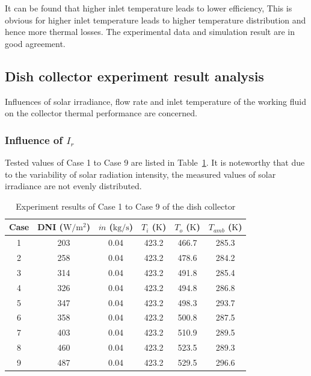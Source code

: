 It can be found that higher inlet temperature leads to lower efficiency, This is obvious for higher inlet temperature leads to higher temperature distribution and hence more thermal losses. The experimental data and simulation result are in good agreement.

\subsection{Dish collector experiment result analysis}
Influences of solar irradiance, flow rate and inlet temperature of the working fluid on the collector thermal performance are concerned.
\subsubsection{Influence of $I_r$}
Tested values of Case 1 to Case 9 are listed in Table~\ref{tab:ResultOfDish1}. It is noteworthy that due to the variability of solar radiation intensity, the measured values of solar irradiance are not evenly distributed.

\begin{table}[htbp]\footnotesize
	\caption{Experiment results of Case 1 to Case 9 of the dish collector}
	\begin{center}
	\begin{tabular}{cccccc}
		\toprule
		Case	& DNI ($\mathrm{W/m^2}$)	&	$\dot{m}$ ($\mathrm{kg/s}$)			&	$T_i$ ($\mathrm{K}$)	&	$T_o$ ($\mathrm{K}$)		&	$T_{amb}$ ($\mathrm{K}$)\\
		\midrule
		1	&	203	&	0.04	&	423.2	&	466.7	&	285.3\\
		2	&	258	&	0.04	&	423.2	&	478.6	&	284.2\\
		3	&	314	&	0.04	&	423.2	&	491.8	&	285.4	\\
		4	&	326	&	0.04	&	423.2	&	494.8	&	286.8\\
		5	&	347	&	0.04	&	423.2	&	498.3	&	293.7\\
		6	&	358	&	0.04	&	423.2	&	500.8	&	287.5\\
		7	&	403	&	0.04	&	423.2	&	510.9	&	289.5\\
		8	&	460	&	0.04	&	423.2	&	523.5	&	289.3\\
		9	&	487	&	0.04	&	423.2	&	529.5	&	296.6\\
		\bottomrule
	\end{tabular}
	\end{center}
	\label{tab:ResultOfDish1}
\end{table}

